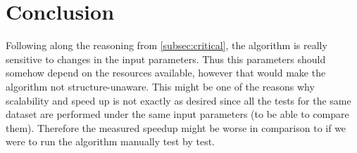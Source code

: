 \documentclass[10pt,journal,compsoc]{IEEEtran}
\begin{document}


\section{Conclusion} \label{sec:conclusion}

%

Following along the reasoning from \ref{subsec:critical}, the algorithm is really sensitive to changes in the input parameters. Thus this parameters should somehow depend on the resources available, however that would make the algorithm not structure-unaware. This might be one of the reasons why scalability and speed up is not exactly as desired since all the tests for the same dataset are performed under the same input parameters (to be able to compare them). Therefore the measured speedup might be worse in comparison to if we were to run the algorithm manually test by test. 
\end{document}
